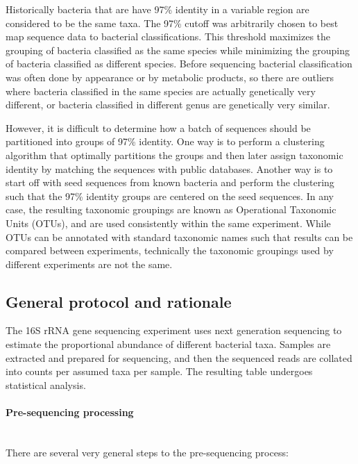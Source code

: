 Historically bacteria that are have 97\% identity in a variable region are considered to be the same taxa. The 97\% cutoff was arbitrarily chosen to best map sequence data to bacterial classifications. This threshold maximizes the grouping of bacteria classified as the same species while minimizing the grouping of bacteria classified as different species. Before sequencing bacterial classification was often done by appearance or by metabolic products, so there are outliers where bacteria classified in the same species are actually genetically very different, or bacteria classified in different genus are genetically very similar.

However, it is difficult to determine how a batch of sequences should be partitioned into groups of 97\% identity. One way is to perform a clustering algorithm that optimally partitions the groups and then later assign taxonomic identity by matching the sequences with public databases. Another way is to start off with seed sequences from known bacteria and perform the clustering such that the 97\% identity groups are centered on the seed sequences. In any case, the resulting taxonomic groupings are known as Operational Taxonomic Units (OTUs), and are used consistently within the same experiment. While OTUs can be annotated with standard taxonomic names such that results can be compared between experiments, technically the taxonomic groupings used by different experiments are not the same.

\subsection{General protocol and rationale}
The 16S rRNA gene sequencing experiment uses next generation sequencing to estimate the proportional abundance of different bacterial taxa. Samples are extracted and prepared for sequencing, and then the sequenced reads are collated into counts per assumed taxa per sample. The resulting table undergoes statistical analysis.

\paragraph{Pre-sequencing processing}\mbox{}\\
There are several very general steps to the pre-sequencing process:

